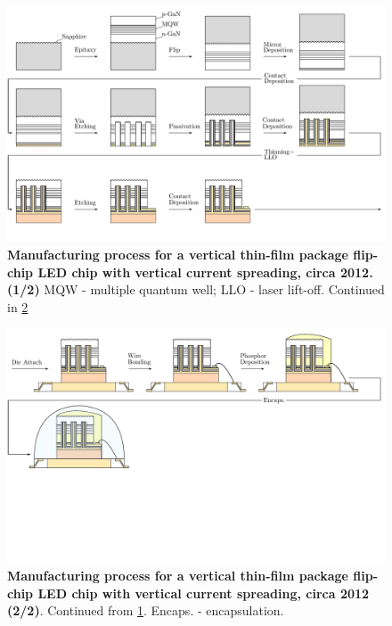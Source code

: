 \documentclass[parskip=full]{article}
\begin{document}
    \begin{landscape}
        \begin{figure}
            \includegraphics[width=595pt]{./figures/vtf_overview_2012-1.pdf}
            \caption{\textbf{Manufacturing process for a vertical thin-film  package flip-chip LED chip with vertical current spreading, circa 2012. (1/2)} MQW - multiple quantum well; LLO - laser lift-off. Continued in \cref{fig:manuf_vtf_2012-2}}
            \label{fig:manuf_vtf_2012-1}
        \end{figure}
    \end{landscape}

    \begin{landscape}
        \begin{figure}
            \includegraphics[width=595pt]{./figures/vtf_overview_2012-2.pdf}
            \caption{\textbf{Manufacturing process for a vertical thin-film package flip-chip LED chip with vertical current spreading, circa 2012 (2/2)}. Continued from \cref{fig:manuf_vtf_2012-1}. Encaps. - encapsulation.}
            \label{fig:manuf_vtf_2012-2}
        \end{figure}
    \end{landscape}
\end{document}
